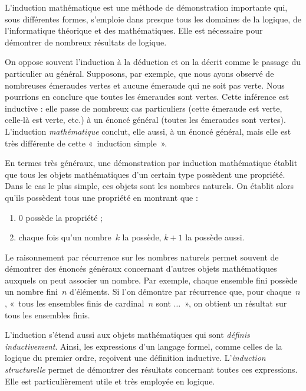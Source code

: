 \documentclass[../../../include/open-logic-section]{subfiles}
\begin{document}


L'induction mathématique est une
méthode de démonstration importante
qui, sous différentes formes,
s'emploie dans presque tous les
domaines de la logique, de
l'informatique théorique et des
mathématiques. Elle est nécessaire
pour démontrer de nombreux
résultats de logique.

On oppose souvent l'induction
à la déduction et on la décrit
comme le passage du particulier
au général. Supposons, par
exemple, que nous ayons observé
de nombreuses émeraudes vertes
et aucune émeraude qui ne soit
pas verte. Nous pourrions en
conclure que toutes les
émeraudes sont vertes.
Cette inférence est inductive :
elle passe de nombreux cas
particuliers (cette émeraude
est verte, celle-là est verte,
etc.) à un énoncé général
(toutes les émeraudes sont
vertes). L'induction
\emph{mathématique} conclut,
elle aussi, à un énoncé
général, mais elle est
très différente de cette
«~induction simple~».

En termes très généraux,
une démonstration par
induction mathématique
établit que tous les
objets mathématiques
d'un certain type
possèdent une propriété.
Dans le cas le plus
simple, ces objets
sont les nombres
naturels. On établit
alors qu'ils possèdent
tous une propriété en
montrant que :
\begin{enumerate}
    \item $0$ possède la propriété ;
    \item chaque fois qu'un nombre~$k$
      la possède, $k+1$ la possède aussi.
\end{enumerate}
Le raisonnement par récurrence
sur les nombres naturels
permet souvent de démontrer
des énoncés généraux
concernant d'autres objets
mathématiques auxquels
on peut associer un nombre.
Par exemple, chaque ensemble
fini possède un nombre fini~$n$
d'éléments. Si l'on démontre
par récurrence que, pour
chaque~$n$, «~tous les
ensembles finis de cardinal~$n$
sont $\dots$~», on obtient
un résultat sur tous
les ensembles finis.

L'induction s'étend aussi
aux objets mathématiques
qui sont \emph{définis
inductivement}. Ainsi,
les expressions d'un
langage formel, comme
celles de la logique
du premier ordre,
reçoivent une définition
inductive. L'\emph{induction
structurelle} permet de
démontrer des résultats
concernant toutes ces
expressions. Elle est
particulièrement utile
et très employée
en logique.
\end{document}
